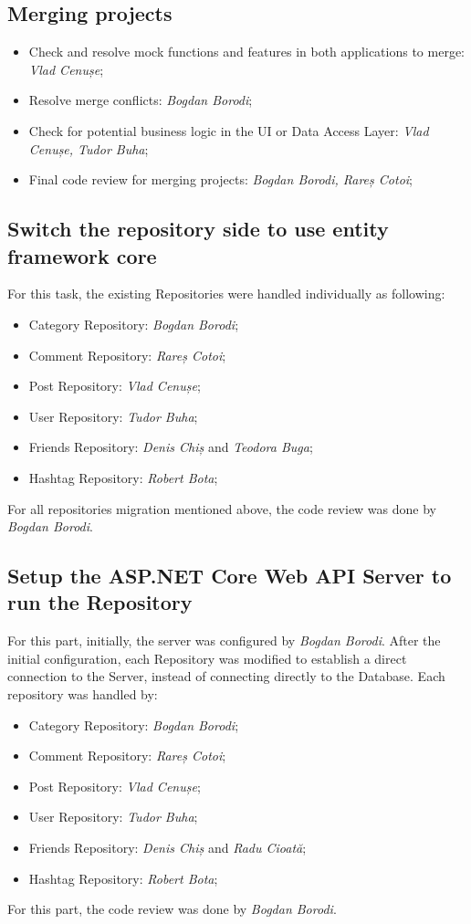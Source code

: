 \documentclass[9pt,a4paper,twocolumn,twoside]{tau-class/tau}
\begin{document}
\subsection{Merging projects}
\begin{itemize}
    \item Check and resolve mock functions and features in both applications to merge: \textit{Vlad Cenușe};
    \item Resolve merge conflicts: \textit{Bogdan Borodi}; 
    \item Check for potential business logic in the UI or Data Access Layer: \textit{Vlad Cenușe, Tudor Buha};
    \item Final code review for merging projects: \textit{Bogdan Borodi, Rareș Cotoi};
\end{itemize}

\subsection{Switch the repository side to use entity framework core}
For this task, the existing Repositories were handled individually as following:
\begin{itemize}
    \item Category Repository: \textit{Bogdan Borodi};
    \item Comment Repository: \textit{Rareș Cotoi}; 
    \item Post Repository: \textit{Vlad Cenușe};
    \item User Repository: \textit{Tudor Buha};
    \item Friends Repository: \textit{Denis Chiș} and \textit{Teodora Buga};
    \item Hashtag Repository: \textit{Robert Bota};
\end{itemize}
For all repositories migration mentioned above, the code review was done by \textit{Bogdan Borodi}.

\subsection{Setup the ASP.NET Core Web API Server to run the Repository}
For this part, initially, the server was configured by \textit{Bogdan Borodi}. After the initial configuration, each Repository was modified to establish a direct connection to the Server, instead of connecting directly to the Database. Each repository was handled by:
\begin{itemize}
    \item Category Repository: \textit{Bogdan Borodi};
    \item Comment Repository: \textit{Rareș Cotoi}; 
    \item Post Repository: \textit{Vlad Cenușe};
    \item User Repository: \textit{Tudor Buha};
    \item Friends Repository: \textit{Denis Chiș} and \textit{Radu Cioată};
    \item Hashtag Repository: \textit{Robert Bota};
\end{itemize}
For this part, the code review was done by \textit{Bogdan Borodi}.
\end{document}
